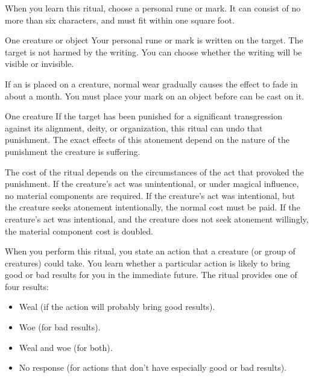 \spellrng{\rngtouch}
\spellspecial When you learn this ritual, choose a personal rune or mark. It can consist of no more than six characters, and must fit within one square foot.
\begin{spelltarget}{One creature or object}
    \spelleffect Your personal rune or mark is written on the target. The target is not harmed by the writing. You can choose whether the writing will be visible or invisible.
\end{spelltarget}
\spellnotes If an  is placed on a creature, normal wear gradually causes the effect to fade in about a month. You must place your mark on an object before  can be cast on it.

\begin{spelltarget}{One creature}
    \spelleffect If the target has been punished for a significant transgression against its alignment, deity, or organization, this ritual can undo that punishment. The exact effects of this atonement depend on the nature of the punishment the creature is suffering.

    The cost of the ritual depends on the circumstances of the act that provoked the punishment. If the creature's act was unintentional, or under magical influence, no material components are required. If the creature's act was intentional, but the creature seeks atonement intentionally, the normal cost must be paid. If the creature's act was intentional, and the creature does not seek atonement willingly, the material component cost is doubled.
\end{spelltarget}

\spellspecial When you perform this ritual, you state an action that a creature (or group of creatures) could take.
\spelleffect You learn whether a particular action is likely to bring good or bad results for you in the immediate future. The ritual provides one of four results:
\begin{itemize}
    \item Weal (if the action will probably bring good results).
    \item Woe (for bad results).
    \item Weal and woe (for both).
    \item No response (for actions that don't have especially good or bad results).
\end{itemize}

